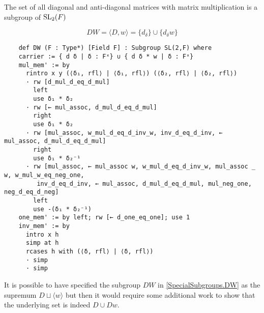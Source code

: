\begin{definition}
    \label{SpecialSubgroups.DW}
    \leanok
    The set of all diagonal and anti-diagonal matrices with matrix multiplication is a subgroup of $\operatorname{SL}_2(F)$

    \begin{equation}\label{antidiag} DW = \langle D, w\rangle  = \{d_\delta \} \cup \{ d_\delta w \} 
    \end{equation}
\end{definition}
\begin{footnotesize}
\begin{verbatim}
    def DW (F : Type*) [Field F] : Subgroup SL(2,F) where
    carrier := { d δ | δ : Fˣ} ∪ { d δ * w | δ : Fˣ}
    mul_mem' := by
      rintro x y (⟨δ₁, rfl⟩ | ⟨δ₁, rfl⟩) (⟨δ₂, rfl⟩ | ⟨δ₂, rfl⟩)
      · rw [d_mul_d_eq_d_mul]
        left
        use δ₁ * δ₂
      · rw [← mul_assoc, d_mul_d_eq_d_mul]
        right
        use δ₁ * δ₂
      · rw [mul_assoc, w_mul_d_eq_d_inv_w, inv_d_eq_d_inv, ← mul_assoc, d_mul_d_eq_d_mul]
        right
        use δ₁ * δ₂⁻¹
      · rw [mul_assoc, ← mul_assoc w, w_mul_d_eq_d_inv_w, mul_assoc _ w, w_mul_w_eq_neg_one,
         inv_d_eq_d_inv, ← mul_assoc, d_mul_d_eq_d_mul, mul_neg_one, neg_d_eq_d_neg]
        left
        use -(δ₁ * δ₂⁻¹)
    one_mem' := by left; rw [← d_one_eq_one]; use 1
    inv_mem' := by
      intro x h
      simp at h
      rcases h with (⟨δ, rfl⟩ | ⟨δ, rfl⟩)
      · simp
      · simp
\end{verbatim}
\end{footnotesize}

\begin{remark}
    It is possible to have specified the subgroup $DW$ in \ref{SpecialSubgroups.DW} as the supremum $D \sqcup \langle w \rangle$
    but then it would require some additional work to show that the underlying set is indeed $D \cup Dw$.
\end{remark}


